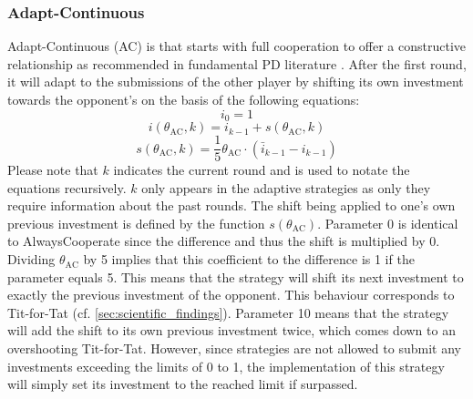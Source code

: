 \documentclass[11pt]{article}
\begin{document}
\subsubsection*{Adapt-Continuous}
Adapt-Continuous (AC) is that starts with full cooperation to offer a constructive relationship as recommended in fundamental PD literature \cite{RC15, Kuh25}.
After the first round, it will adapt to the submissions of the other player by shifting its own investment towards the opponent's on the basis of the following equations:
\begin{equation}
	i_0 = 1
	\label{eq:AC_i0}
\end{equation}
\begin{equation}
	i(\theta_{\mathrm{AC}}, k) = i_{k-1} + s(\theta_{\mathrm{AC}}, k)
	\label{eq:AC_i_eq}
\end{equation}
\begin{equation}
	s(\theta_{\mathrm{AC}}, k) = \frac{1}{5} \theta_{\mathrm{AC}} \cdot (\bar i_{k-1} - i_{k-1})
	\label{eq:AC_s_eq}
\end{equation}
Please note that $k$ indicates the current round and is used to notate the equations recursively.
$k$ only appears in the adaptive strategies as only they require information about the past rounds.
The shift being applied to one's own previous investment is defined by the function $s(\theta_{\mathrm{AC}})$.
Parameter 0 is identical to AlwaysCooperate since the difference and thus the shift is multiplied by 0.
Dividing $\theta_{\mathrm{AC}}$ by 5 implies that this coefficient to the difference is 1 if the parameter equals 5.
This means that the strategy will shift its next investment to exactly the previous investment of the opponent.
This behaviour corresponds to Tit-for-Tat (cf. \ref{sec:scientific_findings}).
Parameter 10 means that the strategy will add the shift to its own previous investment twice, which comes down to an overshooting Tit-for-Tat.
However, since strategies are not allowed to submit any investments exceeding the limits of 0 to 1, the implementation of this strategy will simply set its investment to the reached limit if surpassed.
\end{document}
